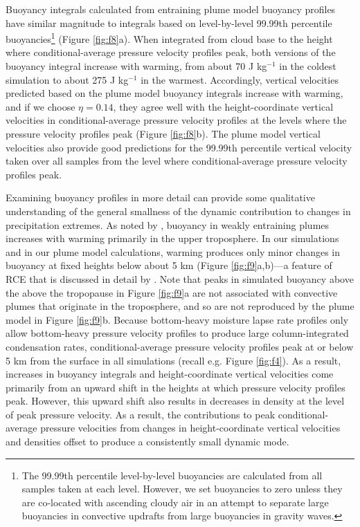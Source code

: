 \documentclass[twocol]{ametsoc}
\begin{document}
Buoyancy integrals calculated from entraining plume model buoyancy profiles have similar magnitude to integrals based on level-by-level 99.99th percentile buoyancies\footnote{The 99.99th percentile level-by-level buoyancies are calculated from all samples taken at each level. However, we set buoyancies to zero unless they are co-located with ascending cloudy air in an attempt to separate large buoyancies in convective updrafts from large buoyancies in gravity waves.} (Figure \ref{fig:f8}a). When integrated from cloud base to the height where conditional-average pressure velocity profiles peak, both versions of the buoyancy integral increase with warming, from about 70 J kg$^{-1}$ in the coldest simulation to about 275 J kg$^{-1}$ in the warmest. Accordingly, vertical velocities predicted based on the plume model buoyancy integrals increase with warming, and if we choose $\eta = 0.14$, they agree well with the height-coordinate vertical velocities in conditional-average pressure velocity profiles at the levels where the pressure velocity profiles peak (Figure \ref{fig:f8}b). The plume model vertical velocities also provide good predictions for the 99.99th percentile vertical velocity taken over all samples from the level where conditional-average pressure velocity profiles peak.

Examining buoyancy profiles in more detail can provide some qualitative understanding of the general smallness of the dynamic contribution to changes in precipitation extremes. As noted by \citet{Singh2015IncreasesEquilibrium}, buoyancy in weakly entraining plumes increases with warming primarily in the upper troposphere. In our simulations and in our plume model calculations, warming produces only minor changes in buoyancy at fixed heights below about 5 km (Figure \ref{fig:f9}a,b)---a feature of RCE that is discussed in detail by \citet{Seeley2015WhyWarming}. Note that peaks in simulated buoyancy above the above the tropopause in Figure \ref{fig:f9}a are not associated with convective plumes that originate in the troposphere, and so are not reproduced by the plume model in Figure \ref{fig:f9}b. Because bottom-heavy moisture lapse rate profiles only allow bottom-heavy pressure velocity profiles to produce large column-integrated condensation rates, conditional-average pressure velocity profiles peak at or below 5 km from the surface in all simulations (recall e.g. Figure \ref{fig:f4}). As a result, increases in buoyancy integrals and height-coordinate vertical velocities come primarily from an upward shift in the heights at which pressure velocity profiles peak. However, this upward shift also results in decreases in density at the level of peak pressure velocity. As a result, the contributions to peak conditional-average pressure velocities from changes in height-coordinate vertical velocities and densities offset to produce a consistently small dynamic mode.
\end{document}
